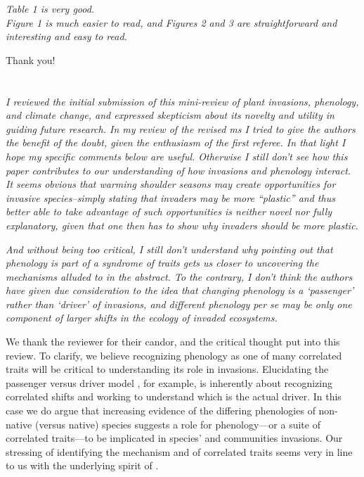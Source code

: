 \documentclass[11pt,a4paper]{letter}
\begin{document}
\begin{letter}{}
\emph{Table 1 is very good.\\
Figure 1 is much easier to read, and Figures 2 and 3 are straightforward and interesting and easy to read.}

Thank you!\\
\clearpage
{}\\
\\
\emph{I reviewed the initial submission of this mini-review of plant invasions, phenology, and climate change, and expressed skepticism about its novelty and utility in guiding future research. In my review of the revised ms I tried to give the authors the benefit of the doubt, given the enthusiasm of the first referee. In that light I hope my specific comments below are useful. Otherwise I still don't see how this paper contributes to our understanding of how invasions and phenology interact. It seems obvious that warming shoulder seasons may create opportunities for invasive species--simply stating that invaders may be more ``plastic'' and thus better able to take advantage of such opportunities is neither novel nor fully explanatory, given that one then has to show why invaders should be more plastic.}

\emph{And without being too critical, I still don't understand why pointing out that phenology is part of a syndrome of traits gets us closer to uncovering the mechanisms alluded to in the abstract. To the contrary, I don't think the authors have given due consideration to the idea that changing phenology is a `passenger' rather than `driver' of invasions, and different phenology per se may be only one component of larger shifts in the ecology of invaded ecosystems.}

We thank the reviewer for their candor, and the critical thought put into this review. To clarify, we believe recognizing phenology as one of many correlated traits will be critical to understanding its role in invasions. Elucidating the passenger versus driver model \citep{MacDougall:2005oe}, for example, is inherently about recognizing correlated shifts and working to understand which is the actual driver. In this case we do argue that increasing evidence of the differing phenologies of non-native (versus native) species suggests a role for phenology---or a suite of correlated traits---to be implicated in species' and communities invasions. Our stressing of identifying the mechanism and of correlated traits seems very in line to us with the underlying spirit of \citet{MacDougall:2005oe}.\\


\end{letter}
\end{document}
